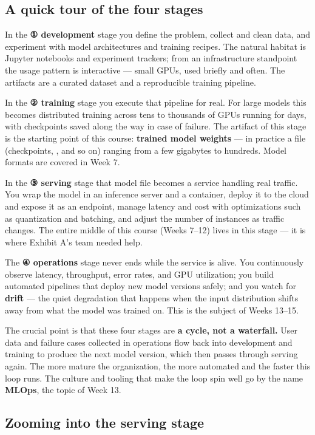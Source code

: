 \subsection*{A quick tour of the four stages}

In the \textbf{① development} stage you define the problem, collect and clean data, and experiment with model architectures and training recipes. The natural habitat is Jupyter notebooks and experiment trackers; from an infrastructure standpoint the usage pattern is interactive — small GPUs, used briefly and often. The artifacts are a curated dataset and a reproducible training pipeline.

In the \textbf{② training} stage you execute that pipeline for real. For large models this becomes distributed training across tens to thousands of GPUs running for days, with checkpoints saved along the way in case of failure. The artifact of this stage is the starting point of this course: \textbf{trained model weights} — in practice a file (checkpoints, , and so on) ranging from a few gigabytes to hundreds. Model formats are covered in Week 7.

In the \textbf{③ serving} stage that model file becomes a service handling real traffic. You wrap the model in an inference server and a container, deploy it to the cloud and expose it as an endpoint, manage latency and cost with optimizations such as quantization and batching, and adjust the number of instances as traffic changes. The entire middle of this course (Weeks 7–12) lives in this stage — it is where Exhibit A's team needed help.

The \textbf{④ operations} stage never ends while the service is alive. You continuously observe latency, throughput, error rates, and GPU utilization; you build automated pipelines that deploy new model versions safely; and you watch for \textbf{drift} — the quiet degradation that happens when the input distribution shifts away from what the model was trained on. This is the subject of Weeks 13–15.

The crucial point is that these four stages are \textbf{a cycle, not a waterfall.} User data and failure cases collected in operations flow back into development and training to produce the next model version, which then passes through serving again. The more mature the organization, the more automated and the faster this loop runs. The culture and tooling that make the loop spin well go by the name \textbf{MLOps}, the topic of Week 13.

\subsection*{Zooming into the serving stage}

